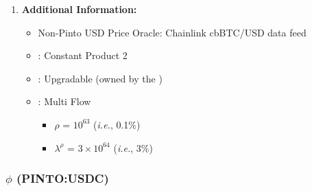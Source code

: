 \documentclass[class=article, crop=false]{standalone}
\begin{document}
\begin{enumerate}
    \item \textbf{Additional Information:}
        \begin{itemize}
            \item Non-Pinto USD Price Oracle: Chainlink cbBTC/USD data feed
            \item {}: Constant Product 2
            \item {}: Upgradable  (owned by the )
            \item {}: Multi Flow
                \begin{itemize}
                    \item $\rho$ = $10^{63}$ (\textit{i.e.}, 0.1\%)
                    \item $\lambda^{\rho}$ = $3 \times 10^{64}$ (\textit{i.e.}, 3\%)
                \end{itemize}
        \end{itemize}
    
\end{enumerate}


\subsubsection{$\phi$ (PINTO:USDC)}
\end{document}
